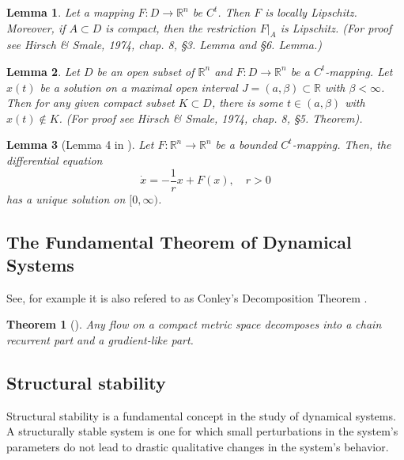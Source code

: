 \documentclass{article}
\newtheorem{theorem}{Theorem}
\newtheorem{lemma}{Lemma}
\theoremstyle{definition}
\theoremstyle{remark}
\newcounter{ct}
\begin{document}
\begin{lemma}
Let a mapping \( F : D \to \mathbb{R}^n \) be \( C^t \). 
Then \( F \) is locally Lipschitz. Moreover, if \( A \subset D \) is compact, then the restriction \( F|_A \) is Lipschitz.
(For proof see Hirsch \& Smale, 1974, chap. 8, §3. Lemma and §6. Lemma.)
\end{lemma}	


\begin{lemma}
Let \( D \) be an open subset of \( \mathbb{R}^n \) and \( F : D \to \mathbb{R}^n \) be a \( C^t \)-mapping. 
Let \( x(t) \) be a solution on a maximal open interval \( J = (a, \beta) \subset \mathbb{R} \) with \( \beta < \infty \). 
Then for any given compact subset \( K \subset D \), there is some \( t \in (a, \beta) \) with \( x(t) \notin K \). 
(For proof see Hirsch \& Smale, 1974, chap. 8, §5. Theorem).
\end{lemma}	


\begin{lemma}[Lemma 4 in \citep{funahashi1993approximation}]
Let \( F: \mathbb{R}^n \to \mathbb{R}^n \) be a bounded \( C^t \)-mapping. Then, the differential equation
\[
\dot{x} = -\frac{1}{r} x + F(x), \quad r > 0
\]
has a unique solution on \([0, \infty)\).
\end{lemma}	

\subsection{The Fundamental Theorem of Dynamical Systems}
See, for example\citep{conley1978morse, norton1995fundamental} it is also refered to as Conley's Decomposition Theorem \citep{mischaikow1999cit}.

\begin{theorem}[\citep{conley1978morse}]
 Any flow on a compact metric space decomposes into a chain recurrent part and a gradient-like part.
\end{theorem}

\subsection{Structural stability}
\citep{peixoto1959ss, mane1987ss, hu1994ss, hayashi1997invariant, robbin1971ss, robinson1974ss, palis1970ss}

Structural stability is a fundamental concept in the study of dynamical systems. A structurally stable system is one for which small perturbations in the system's parameters do not lead to drastic qualitative changes in the system's behavior.
\end{document}
